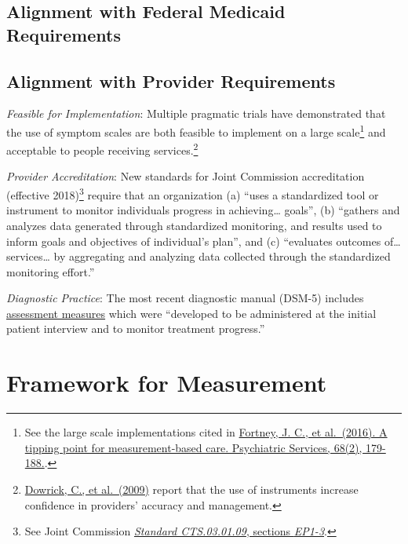 \documentclass[
]{book}
\begin{document}
\hypertarget{alignment-with-federal-medicaid-requirements}{%
\subsection{Alignment with Federal Medicaid Requirements}\label{alignment-with-federal-medicaid-requirements}}

\hypertarget{alignment-with-provider-requirements}{%
\subsection{Alignment with Provider Requirements}\label{alignment-with-provider-requirements}}

\emph{Feasible for Implementation}: Multiple pragmatic trials have demonstrated that the use of symptom scales are both feasible to implement on a large scale\footnote{See the large scale implementations cited in \href{https://ps.psychiatryonline.org/doi/full/10.1176/appi.ps.201500439\#T1}{Fortney, J. C., et al.~(2016). A tipping point for measurement-based care. Psychiatric Services, 68(2), 179-188.}.} and acceptable to people receiving services.\footnote{\href{https://www.bmj.com/content/338/bmj.b663.long}{Dowrick, C., et al.~(2009)} report that the use of instruments increase confidence in providers' accuracy and management.}

\emph{Provider Accreditation}: New standards for Joint Commission accreditation (effective 2018)\footnote{See Joint Commission \href{https://www.jointcommission.org/assets/1/6/Approved_BHC_outcome_meas_2018.pdf}{\emph{Standard CTS.03.01.09}, sections \emph{EP1-3}}.} require that an organization (a) ``uses a standardized tool or instrument to monitor individuals progress in achieving\ldots{} goals'', (b) ``gathers and analyzes data generated through standardized monitoring, and results used to inform goals and objectives of individual's plan'', and (c) ``evaluates outcomes of\ldots{} services\ldots{} by aggregating and analyzing data collected through the standardized monitoring effort.''

\emph{Diagnostic Practice}: The most recent diagnostic manual (DSM-5) includes \href{https://www.psychiatry.org/psychiatrists/practice/dsm/educational-resources/assessment-measures}{assessment measures} which were ``developed to be administered at the initial patient interview and to monitor treatment progress.''

\hypertarget{framework-for-measurement}{%
\section{Framework for Measurement}\label{framework-for-measurement}}
\end{document}
